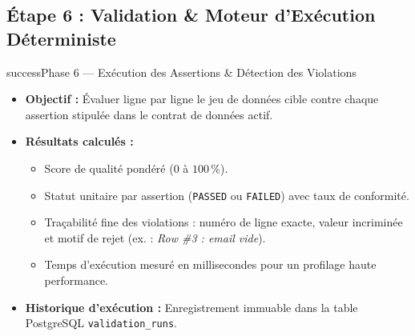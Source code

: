 \documentclass[11pt,a4paper]{article}
\begin{document}
\subsection*{Étape 6 : Validation \& Moteur d'Exécution Déterministe}
\begin{stepbox}{success}{Phase 6 — Exécution des Assertions \& Détection des Violations}
\begin{itemize}
    \item \textbf{Objectif :} Évaluer ligne par ligne le jeu de données cible contre chaque assertion stipulée dans le contrat de données actif.
    \item \textbf{Résultats calculés :}
    \begin{itemize}
        \item Score de qualité pondéré ($0$ à $100\,\%$).
        \item Statut unitaire par assertion (\texttt{PASSED} ou \texttt{FAILED}) avec taux de conformité.
        \item Traçabilité fine des violations : numéro de ligne exacte, valeur incriminée et motif de rejet (ex. : \textit{Row \#3 : email vide}).
        \item Temps d'exécution mesuré en millisecondes pour un profilage haute performance.
    \end{itemize}
    \item \textbf{Historique d'exécution :} Enregistrement immuable dans la table PostgreSQL \texttt{validation\_runs}.
\end{itemize}
\end{stepbox}
\end{document}

